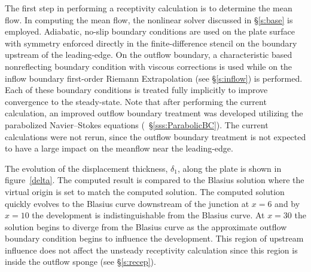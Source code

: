 The first step in performing a receptivity calculation is to determine the
mean flow.  In computing the mean flow, the nonlinear solver discussed in
\S\ref{s:base} is employed.  Adiabatic, no-slip boundary conditions are used
on the plate surface with symmetry enforced directly in the finite-difference
stencil on the boundary upstream of the leading-edge.  On the outflow
boundary, a characteristic based nonreflecting boundary condition with viscous
corrections \cite{PoLe:92} is used while on the inflow boundary first-order
Riemann Extrapolation (see \S\ref{s:inflow}) is performed.  Each of these
boundary conditions is treated fully implicitly to improve convergence to the
steady-state.  Note that after performing the current calculation, an improved
outflow boundary treatment was developed utilizing the parabolized
Navier--Stokes equations (\eg\ \S\ref{sss:ParabolicBC}).  The current
calculations were not rerun, since the outflow boundary treatment is not
expected to have a large impact on the meanflow near the leading-edge.
%
%

The evolution of the displacement thickness, $\delta_1$, along the plate is
shown in figure~\ref{delta}.  The computed result is compared to the Blasius
solution where the virtual origin is set to match the computed solution.  The
computed solution quickly evolves to the Blasius curve downstream of the
junction at $x=6$ and by $x=10$ the development is indistinguishable from the
Blasius curve.  At $x=30$ the solution begins to diverge from the Blasius
curve as the approximate outflow boundary condition begins to influence the
development.  This region of upstream influence does not affect the unsteady
receptivity calculation since this region is inside the outflow sponge (see
\S\ref{s:recep}).


